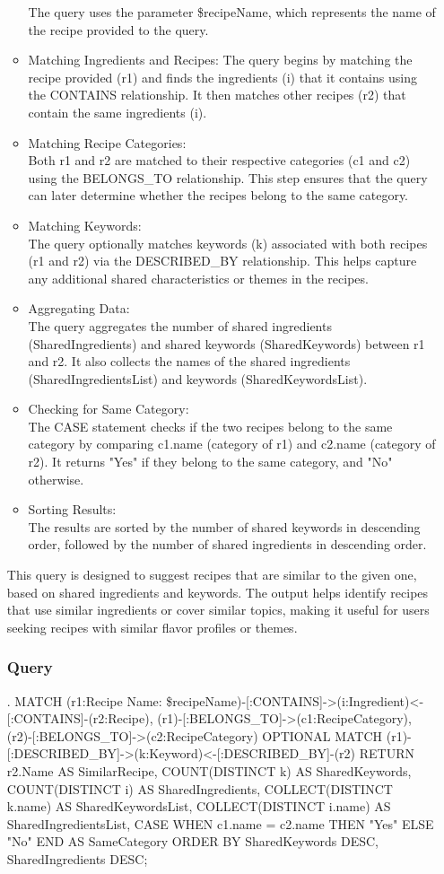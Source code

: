 \begin{enumerate}
\begin{itemize}
    The query uses the parameter \$recipeName, which represents the name of the
recipe provided to the query.
        \item Matching Ingredients and Recipes:
    The query begins by matching the recipe provided (r1) and finds the ingredients (i) that it contains using the CONTAINS relationship. It then matches other recipes (r2) that contain the same ingredients (i).
        \item Matching Recipe Categories:\\
    Both r1 and r2 are matched to their respective categories (c1 and c2) using the BELONGS\_TO relationship. This step ensures that the query can later determine whether the recipes belong to the same category.
        \item Matching Keywords:\\
    The query optionally matches keywords (k) associated with both recipes (r1 and r2) via the DESCRIBED\_BY relationship. This helps capture any additional shared characteristics or themes in the recipes.
        \item Aggregating Data:\\
        The query aggregates the number of shared ingredients (SharedIngredients) and shared keywords (SharedKeywords) between r1 and r2. It also collects the names of the shared ingredients (SharedIngredientsList) and keywords (SharedKeywordsList).
        \item Checking for Same Category:\\
    The CASE statement checks if the two recipes belong to the same category by comparing c1.name (category of r1) and c2.name (category of r2). It returns "Yes" if they belong to the same category, and "No" otherwise.
        \item Sorting Results:\\
    The results are sorted by the number of shared keywords in descending order, followed by the number of shared ingredients in descending order.
    \end{itemize}
This query is designed to suggest recipes that are similar to the given one, based on shared ingredients and keywords. The output helps identify recipes that use similar ingredients or cover similar topics, making it useful for users seeking recipes with similar flavor profiles or themes.
    \subsubsection{Query}
\begin{CypherQuery}
.
MATCH (r1:Recipe {Name: \$recipeName})-[:CONTAINS]->(i:Ingredient)<-[:CONTAINS]-(r2:Recipe), (r1)-[:BELONGS_TO]->(c1:RecipeCategory), (r2)-[:BELONGS_TO]->(c2:RecipeCategory)
OPTIONAL MATCH (r1)-[:DESCRIBED_BY]->(k:Keyword)<-[:DESCRIBED_BY]-(r2)
RETURN r2.Name AS SimilarRecipe,  COUNT(DISTINCT k) AS SharedKeywords, COUNT(DISTINCT i) AS SharedIngredients, COLLECT(DISTINCT k.name) AS SharedKeywordsList, COLLECT(DISTINCT i.name) AS SharedIngredientsList, CASE WHEN c1.name = c2.name THEN "Yes" ELSE "No" END AS SameCategory
ORDER BY SharedKeywords DESC, SharedIngredients DESC;
\end{CypherQuery}

\end{enumerate}
